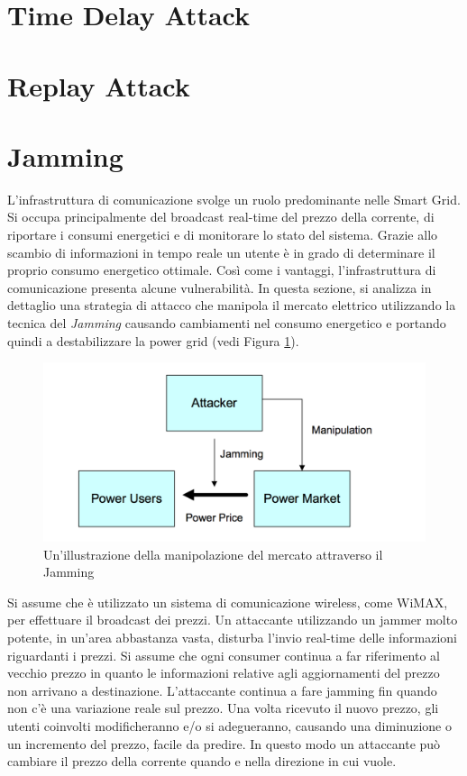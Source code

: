 \section{Time Delay Attack}
\section{Replay Attack}
\section{Jamming}
L'infrastruttura di comunicazione svolge un ruolo predominante nelle Smart Grid. Si occupa principalmente del broadcast real-time del prezzo della corrente, di riportare i consumi energetici e di monitorare lo stato del sistema. Grazie allo scambio di informazioni in tempo reale un utente è in grado di determinare il proprio consumo energetico ottimale. Così come i vantaggi, l'infrastruttura di comunicazione presenta alcune vulnerabilità. In questa sezione, si analizza in dettaglio una strategia di attacco che manipola il mercato elettrico utilizzando la tecnica del \emph{Jamming} causando cambiamenti nel consumo energetico e portando quindi a destabilizzare la power grid (vedi Figura \ref{fig:jm}). 
\begin{figure}[h]
	\centering
	\includegraphics[scale=0.320]{imgs/attack/jm.png}
	\caption{Un'illustrazione della manipolazione del mercato attraverso il Jamming} \label{fig:jm}
\end{figure}
Si assume che è utilizzato un sistema di comunicazione wireless, come WiMAX, per effettuare il broadcast dei prezzi. Un attaccante utilizzando un jammer molto potente, in un'area abbastanza vasta, disturba l'invio real-time delle informazioni riguardanti i prezzi. Si assume che ogni consumer continua a far riferimento al vecchio prezzo in quanto le informazioni relative agli aggiornamenti del prezzo non arrivano a destinazione. L'attaccante continua a fare jamming fin quando non c'è una variazione reale sul prezzo. Una volta ricevuto il nuovo prezzo, gli utenti coinvolti modificheranno e/o si adegueranno, causando una diminuzione o un incremento del prezzo, facile da predire. In questo modo un attaccante può cambiare il prezzo della corrente quando e nella direzione in cui vuole.
